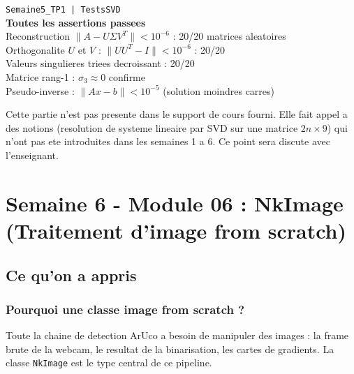 \documentclass[12pt,a4paper]{report}
\newcommand{\code}[1]{\texttt{\textcolor{PrimaryBlue}{#1}}}
\begin{document}
\begin{tpbox}
\begin{resultbox}
\centering
\texttt{Semaine5\_TP1 | TestsSVD}\\[4pt]
\textbf{Toutes les assertions passees}\\[2pt]
Reconstruction $\|A - U\Sigma V^T\| < 10^{-6}$ : 20/20 matrices aleatoires\\
Orthogonalite $U$ et $V$ : $\|UU^T - I\| < 10^{-6}$ : 20/20\\
Valeurs singulieres triees decroissant : 20/20\\
Matrice rang-1 : $\sigma_3 \approx 0$ confirme\\
Pseudo-inverse : $\|Ax - b\| < 10^{-5}$ (solution moindres carres)
\end{resultbox}
\end{tpbox}

\begin{tpbox}
\begin{warnbox}
Cette partie n'est pas presente dans le support de cours fourni. Elle fait appel a des notions (resolution de systeme lineaire par SVD sur une matrice $2n \times 9$) qui n'ont pas ete introduites dans les semaines 1 a 6. Ce point sera discute avec l'enseignant.
\end{warnbox}
\end{tpbox}

\chapter{Semaine 6 - Module 06 : NkImage (Traitement d'image from scratch)}

\section{Ce qu'on a appris}

\subsection*{Pourquoi une classe image from scratch ?}

Toute la chaine de detection ArUco a besoin de manipuler des images : la frame brute de la webcam, le resultat de la binarisation, les cartes de gradients. La classe \code{NkImage} est le type central de ce pipeline.
\end{document}

